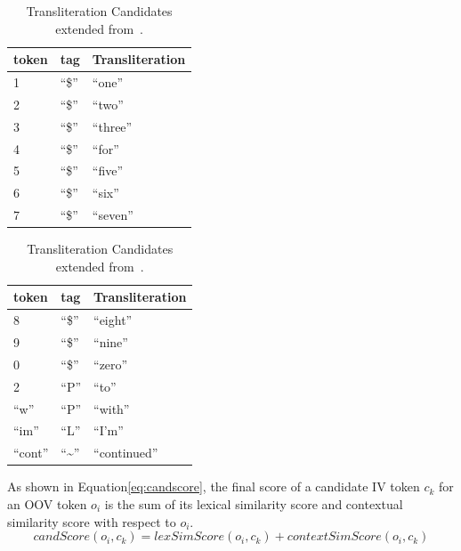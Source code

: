 \documentclass[a4paper,onesided,12pt]{report}
\begin{document}
\begin{table}[ht]
  \caption{Transliteration Candidates extended from~\cite{Gouws:2011:CBL:2021109.2021113}.}
  \begin{minipage}[c]{0.5\linewidth}
    \begin{tabular}[l]{|l|l|l|}
    \hline
    \textbf{token} & \textbf{tag} & \textbf{Transliteration} \\\hline
    1 & ``\$'' & ``one'' \\\hline
    2 & ``\$'' & ``two'' \\\hline
    3 & ``\$'' & ``three'' \\\hline
    4 & ``\$'' & ``for'' \\\hline
    5 & ``\$'' & ``five'' \\\hline
    6 & ``\$'' & ``six'' \\\hline
    7 & ``\$'' & ``seven'' \\\hline
  \end{tabular}
\end{minipage}
  \begin{minipage}[c]{0.5\linewidth}
    \begin{tabular}[l]{|l|l|l|}
    \hline
    \textbf{token} & \textbf{tag} & \textbf{Transliteration} \\\hline
    8 & ``\$'' & ``eight'' \\\hline
    9 & ``\$'' & ``nine'' \\\hline
    0 & ``\$'' & ``zero'' \\\hline
    2 & ``P''  & ``to'' \\\hline
    ``w'' & ``P''  & ``with'' \\\hline
    ``im'' & ``L''  & ``I'm'' \\\hline
    ``cont'' & ``\textasciitilde''  & ``continued'' \\\hline
  \end{tabular}
  \end{minipage}
\label{tab:transliteral}
\end{table}


As shown in Equation\ref{eq:candscore}, the final score of a candidate IV token $c_k$ for an OOV token $o_i$ is the sum of its lexical similarity score and contextual similarity score with respect to $o_i$.
\begin{equation}
candScore(o_i,c_k) = lexSimScore(o_i,c_k) + contextSimScore(o_i,c_k)
\label{eq:candscore}
\end{equation}
\end{document}
